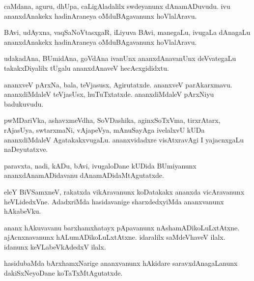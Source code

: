 \documentclass{article}
\begin{document}
\begin{mn}
caMdana,  aguru,  dhUpa,  caLigAladalilx  swdeyanunx  dAnamADuvudu.  ivu  ananxdAnakekx  
hadinAraneya  oMduBAgavanunx  hoVlalAravu.
\end{mn}

\begin{mn}
BAvi,  udAyxna,  vaqSaNoVtasxgaR,  iLiyuva  BAvi,  manegaLu,  ivugaLa  dAnagaLu  ananxdAnakekx  
hadinAraneya  oMduBAgavanunx  hoVlalAravu.
\end{mn}

\begin{mn}
udakadAna,  BUmidAna,  goVdAna  ivanUnx  ananxdAnavanUnx  deVvategaLu  takakxDiyalilx  
tUgalu  ananxdAnaveV  hecAcxgididxtu.
\end{mn}

\begin{mn}
ananxveV  pArxNa,  bala,  teVjasusx,  Agirutatxde.  ananxveV  parAkarxmavu.  ananxdiMdaleV  
teVjasUsx,  huTuTxtatxde.  ananxdiMdaleV  pArxNiyu  badukuvudu.
\end{mn}

\begin{mn}
pwMDariVka,  ashavxmeVdha,  SoVDashika,  aginxSoTxVma,  tirxrAtarx,  rAjasUya,  
swtarxmaNi,  vAjapeVya,  mAnuSayAga  ivelalxvU  kUDa  ananxdiMdaleV  AgatakakxvugaLu.  
ananxvidadxre  visAtxravAgi  I  yajacnxgaLu  naDeyutatxve.
\end{mn}

\begin{mn}
paravxta,  nadi,  kADu,  bAvi,  ivugaloDane  kUDida  BUmiyanunx  
ananxdAnamADidavanu  dAnamADidaMtAgutatxde.
\end{mn}

\begin{mn}
eleY  BiVSamxneV,  rakatxda  vikAravanunx  koDatakakx  ananxda  vicAravanunx  
heVLidedxVne.  AdadxriMda  hasidavanige  sharxdedxyiMda  ananxvanunx  hAkabeVku.  
\end{mn}

\begin{mn}
ananx  hAkuvavanu  barxhamxhatayx  pApavanunx  nAshamADikoLuLxtAtxne.  ajAcnxnavanunx  
hALumADikoLuLxtAtxne.  idaralilx  saMdeVhaveV  ilalx.  idanunx  keVLabeVkAdedxV  ilalx.
\end{mn}

\begin{mn}
hasidubaMda  bArxhamxNarige  ananxvanunx  hAkidare  saravxdAnagaLanunx  
dakiSxNeyoDane  koTaTxMtAgutatxde.  
\end{mn}
\end{document}

